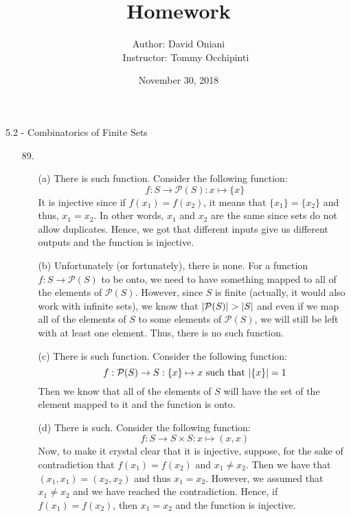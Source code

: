 \documentclass[12pt, a4paper]{article}
\title{\bf{Homework \textnumero 13}}
\author{Author: David Oniani
\\
\ \ \ Instructor: Tommy Occhipinti}
\date{November 30, 2018}
\DeclarePairedDelimiter\abs{\lvert}{\rvert}
\newcommand{\rarr}{\rightarrow}
\begin{document}
\maketitle
{\Large 5.2 - Combinatorics of Finite Sets}
\begin{itemize}
\item[89.]
\begin{itemize}
\item[(a)]
There is such function. Consider the following function:
$$f : S \rarr \mathcal{P}(S) : x \mapsto \{x\}$$
It is injective since if $f(x_1) = f(x_2)$, it means that $\{x_1\} = \{x_2\}$
and thus, $x_1 = x_2$. In other words, $x_1$ and $x_2$ are the same since sets do not
allow duplicates. Hence, we got that different inputs give us different outputs and the
function is injective.

\item[]

\item[(b)]
Unfortunately (or fortunately), there is none. For a function $f : S \rarr \mathcal{P}(S)$
to be onto, we need to have something mapped to all of the elements of $\mathcal{P}(S)$.
However, since $S$ is finite (actually, it would also work with infinite sets), we know that $\abs{\mathcal{P}(S)} > \abs{S}$ and even if
we map all of the elements of $S$ to some elements of $\mathcal{P}(S)$, we will still be left
with at least one element. Thus, there is no such function.

\item[]

\item[(c)]
There is such function. Consider the following function:
$$f : \mathcal{P}(S) \rarr S : \{x\} \mapsto x \mbox{ such that } \abs{\{x\}} = 1$$
Then we know that all of the elements of $S$ will have the set of the element
mapped to it and the function is onto.

\item[]

\item[(d)]
There is such. Consider the following function:
$$f : S \rarr S \times S : x \mapsto (x, x)$$
Now, to make it crystal clear that it is injective, suppose, for the sake
of contradiction that $f(x_1) = f(x_2)$ and $x_1 \neq x_2$. Then we have that
$(x_1, x_1) = (x_2, x_2)$ and thus $x_1 = x_2$. However, we assumed that $x_1 \neq x_2$
and we have reached the contradiction. Hence, if $f(x_1) = f(x_2)$, then $x_1 = x_2$
and the function is injective.

\item[]


\end{itemize}
\end{itemize}
\end{document}
